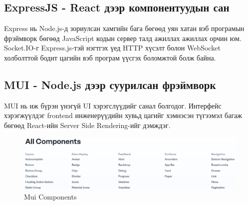 \subsection{ExpressJS - React дээр компонентуудын сан}

Express нь Node.js-д зориулсан хамгийн бага бөгөөд уян хатан вэб програмын фрэймворк бөгөөд JavaScript кодын сервер талд ажиллах ажиллах орчин юм.
Socket.IO-г Express.js-тэй нэгтгэх үед HTTP хүсэлт болон WebSocket холболттой бодит цагийн вэб програм үүсгэх боломжтой болж байна.

\subsection{MUI - Node.js дээр суурилсан фрэймворк}

MUI нь иж бүрэн үнэгүй UI хэрэгслүүдийг санал болгодог.
Интерфейс хэрэгжүүлдэг frontend инженерүүдийн хувьд цагийг хэмнэсэн түгээмэл багаж бөгөөд React-ийн Server Side Rendering-ийг дэмждэг.

\begin{figure}[h]
	\centering
	\includegraphics[width=15cm]{images/MUI.png}
	\caption{Mui Components}
	\label{fig:research}
\end{figure}
